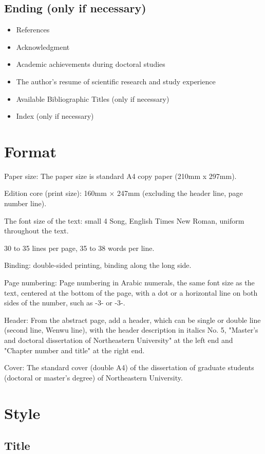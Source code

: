\subsection{Ending (only if necessary)}
\begin{itemize}
    \item References
    \item Acknowledgment
    \item Academic achievements during doctoral studies
    \item The author's resume of scientific research and study experience
    \item Available Bibliographic Titles (only if necessary)
    \item Index (only if necessary)
\end{itemize}

\section{Format}
Paper size: The paper size is standard A4 copy paper (210mm x 297mm).

Edition core (print size): 160mm × 247mm (excluding the header line, page number line).

The font size of the text: small 4 Song, English Times New Roman, uniform throughout the text.

30 to 35 lines per page, 35 to 38 words per line.

Binding: double-sided printing, binding along the long side.

Page numbering: Page numbering in Arabic numerals, the same font size as the text, centered at the bottom of the page, with a dot or a horizontal line on both sides of the number, such as -3- or -3-.

Header: From the abstract page, add a header, which can be single or double line (second line, Wenwu line), with the header description in italics No. 5, "Master's and doctoral dissertation of Northeastern University" at the left end and "Chapter number and title" at the right end.

Cover: The standard cover (double A4) of the dissertation of graduate students (doctoral or master's degree) of Northeastern University.

\section{Style}

\subsection{Title}

